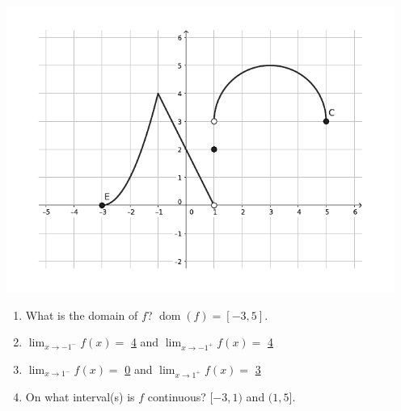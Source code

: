 \documentclass[12pt]{article}
\newcommand{\points}[1]{\marginpar{\hspace{24pt}[#1]}}
\newcommand{\di}{\displaystyle}
\begin{document}
\begin{enumerate}
\begin{center}
 \includegraphics[width=5in]{TT1_fig1}
\end{center}

\begin{enumerate}
 \item What is the domain of $f$?  $\operatorname{dom}(f) = [-3,5]$.\points{1}

\bigskip


 \item $\di\lim_{x \to -1^-}f(x)= $ \underline{\hspace{0.3in}4\hspace{0.3in}} and $\di \lim_{x\to -1^+}f(x)= $ \underline{\hspace{0.3in}4\hspace{0.3in}}  \points{1}

\bigskip




 \item $\di \lim_{x \to 1^-}f(x)=$ \underline{\hspace{0.3in}0\hspace{0.3in}} and $\di \lim_{x\to 1^+}f(x) =$ \underline{\hspace{0.3in}3\hspace{0.3in}} \points{1}

\bigskip



 \item On what interval(s) is $f$ continuous? $[-3,1)$ and $(1,5]$.\points{1}
\end{enumerate}

\bigskip




\end{enumerate}
\end{document}
